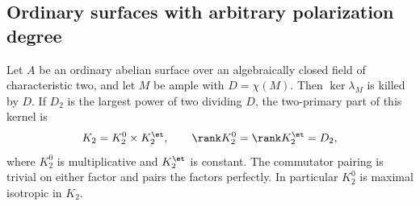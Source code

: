 \subsection{Ordinary surfaces with arbitrary polarization degree}
\label{sec:DE-A3-ordinary-all-polarizations}

\begin{lemma}
\label{lem:DE-A3-ordinary-polarization-kernel}
Let $A$ be an ordinary abelian surface over an algebraically closed
field of characteristic two, and let $M$ be ample with $D=\chi(M)$.
Then $\ker\lambda_M$ is killed by $D$.  If $D_2$ is the largest
power of two dividing $D$, the two-primary part of this kernel is
\[
             K_2=K_2^0\times K_2^{\et},
             \qquad \rank K_2^0=\rank K_2^{\et}=D_2,
\]
where $K_2^0$ is multiplicative and $K_2^{\et}$ is constant.
The commutator pairing is trivial on either factor and pairs the
factors perfectly.  In particular $K_2^0$ is maximal isotropic
in $K_2$.
\end{lemma}
